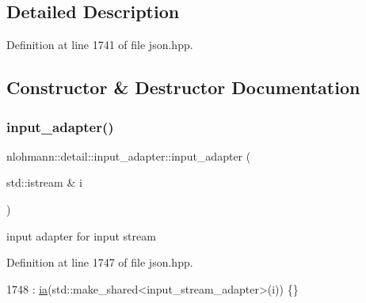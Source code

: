 \subsection{Detailed Description}


Definition at line 1741 of file json.\+hpp.



\subsection{Constructor \& Destructor Documentation}
\mbox{\label{classnlohmann_1_1detail_1_1input__adapter_ae89f11268d4724b3080473f7218abe86}} 
\subsubsection{\texorpdfstring{input\+\_\+adapter()}{input\_adapter()}\hspace{0.1cm}{\footnotesize\ttfamily [1/7]}}
{\footnotesize\ttfamily nlohmann\+::detail\+::input\+\_\+adapter\+::input\+\_\+adapter (\begin{DoxyParamCaption}\item[{std\+::istream \&}]{i }\end{DoxyParamCaption})\hspace{0.3cm}{\ttfamily [inline]}}



input adapter for input stream 



Definition at line 1747 of file json.\+hpp.


\begin{DoxyCode}
1748         : \hyperlink{classnlohmann_1_1detail_1_1input__adapter_ad5a11d0b65b68f6950cfbe8c8366b7da}{ia}(std::make\_shared<input\_stream\_adapter>(i)) \{\}
\end{DoxyCode}
\mbox{\label{classnlohmann_1_1detail_1_1input__adapter_af002dd2e53ac0855a03cb68d0ce626b2}} 
